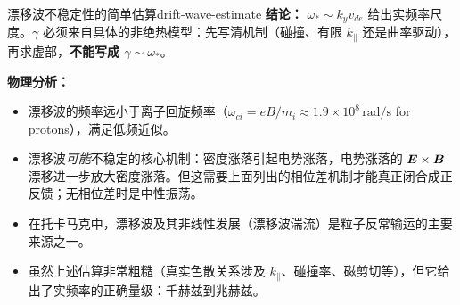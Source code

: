 \begin{example}{漂移波不稳定性的简单估算}{drift-wave-estimate}
\textbf{结论：} $\omega_*\sim k_yv_{de}$ 给出实频率尺度。$\gamma$ 必须来自具体的非绝热模型：先写清机制（碰撞、有限 $k_\parallel$ 还是曲率驱动），再求虚部，\textbf{不能写成 $\gamma\sim\omega_*$}。

\textbf{物理分析：}
\begin{itemize}[leftmargin=*,itemsep=0pt]
\item 漂移波的频率远小于离子回旋频率（$\omega_{ci} = eB/m_i \approx 1.9\times 10^{8}\,\mathrm{rad/s}$ for protons），满足低频近似。
\item 漂移波\emph{可能}不稳定的核心机制：密度涨落引起电势涨落，电势涨落的 $\bm{E}\times\bm{B}$ 漂移进一步放大密度涨落。但这需要上面列出的相位差机制才能真正闭合成正反馈；无相位差时是中性振荡。
\item 在托卡马克中，漂移波及其非线性发展（漂移波湍流）是粒子反常输运的主要来源之一。
\item 虽然上述估算非常粗糙（真实色散关系涉及 $k_{\parallel}$、碰撞率、磁剪切等），但它给出了实频率的正确量级：千赫兹到兆赫兹。
\end{itemize}
\end{example}

